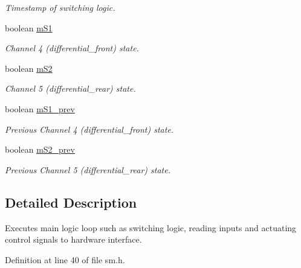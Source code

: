 \begin{DoxyCompactItemize}
\begin{DoxyCompactList}\small\item\em Timestamp of switching logic. \end{DoxyCompactList}\item 
boolean \hyperlink{classSPMB_1_1StateMachine_af37ba6ce3ef9826cd025a6259c42449d}{m\+S1}\hypertarget{classSPMB_1_1StateMachine_af37ba6ce3ef9826cd025a6259c42449d}{}\label{classSPMB_1_1StateMachine_af37ba6ce3ef9826cd025a6259c42449d}

\begin{DoxyCompactList}\small\item\em Channel 4 (differential\+\_\+front) state. \end{DoxyCompactList}\item 
boolean \hyperlink{classSPMB_1_1StateMachine_af7fcd1aec80eb5b7397b163db2e7c2ed}{m\+S2}\hypertarget{classSPMB_1_1StateMachine_af7fcd1aec80eb5b7397b163db2e7c2ed}{}\label{classSPMB_1_1StateMachine_af7fcd1aec80eb5b7397b163db2e7c2ed}

\begin{DoxyCompactList}\small\item\em Channel 5 (differential\+\_\+rear) state. \end{DoxyCompactList}\item 
boolean \hyperlink{classSPMB_1_1StateMachine_af6ffc5aa94ef7f423d217f8fba9cb998}{m\+S1\+\_\+prev}\hypertarget{classSPMB_1_1StateMachine_af6ffc5aa94ef7f423d217f8fba9cb998}{}\label{classSPMB_1_1StateMachine_af6ffc5aa94ef7f423d217f8fba9cb998}

\begin{DoxyCompactList}\small\item\em Previous Channel 4 (differential\+\_\+front) state. \end{DoxyCompactList}\item 
boolean \hyperlink{classSPMB_1_1StateMachine_a1d0a5cbe9d61f50e3d0ac3bdca99b936}{m\+S2\+\_\+prev}\hypertarget{classSPMB_1_1StateMachine_a1d0a5cbe9d61f50e3d0ac3bdca99b936}{}\label{classSPMB_1_1StateMachine_a1d0a5cbe9d61f50e3d0ac3bdca99b936}

\begin{DoxyCompactList}\small\item\em Previous Channel 5 (differential\+\_\+rear) state. \end{DoxyCompactList}\end{DoxyCompactItemize}


\subsection{Detailed Description}
Executes main logic loop such as switching logic, reading inputs and actuating control signals to hardware interface. 

Definition at line 40 of file sm.\+h.

